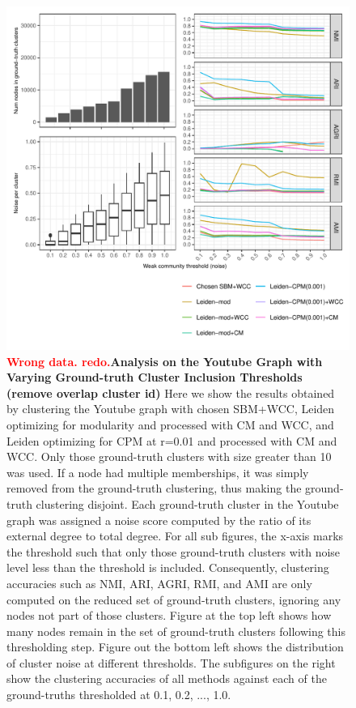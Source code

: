 \documentclass[aps,pre,superscriptaddress]{revtex4}
\begin{document}
\begin{figure}[!htpb]
\centering
\includegraphics[]{figures/accuracy_remove_overlap.pdf}
\caption[]{\textbf{\textcolor{red}{Wrong data. redo.}Analysis on the Youtube Graph with Varying Ground-truth Cluster Inclusion Thresholds (remove overlap cluster id)} Here we show the results obtained by clustering the Youtube graph with chosen SBM+WCC, Leiden optimizing for modularity and processed with CM and WCC, and Leiden optimizing for CPM at r=0.01 and processed with CM and WCC. Only those ground-truth clusters with size greater than 10 was used. If a node had multiple memberships, it was simply removed from the ground-truth clustering, thus making the ground-truth clustering disjoint. Each ground-truth cluster in the Youtube graph was assigned a noise score computed by the ratio of its external degree to total degree. For all sub figures, the x-axis marks the threshold such that only those ground-truth clusters with noise level less than the threshold is included. Consequently, clustering accuracies such as NMI, ARI, AGRI, RMI, and AMI are only computed on the reduced set of ground-truth clusters, ignoring any nodes not part of those clusters. Figure at the top left shows how many nodes remain in the set of ground-truth clusters following this thresholding step. Figure out the bottom left shows the distribution of cluster noise at different thresholds. The subfigures on the right show the clustering accuracies of all methods against each of the ground-truths thresholded at 0.1, 0.2, ..., 1.0. }
\label{fig:youtube-accuracy-remove-overlap}
\end{figure}
\end{document}
